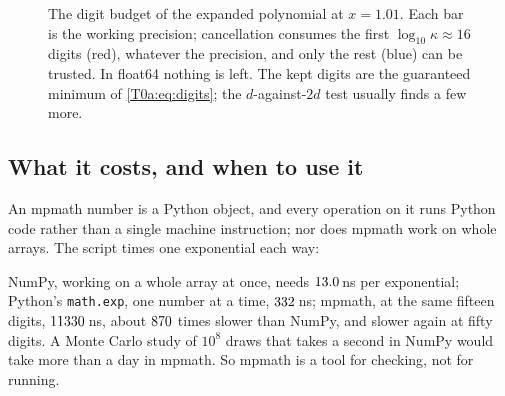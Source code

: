\begin{figure}[htbp]
\centering
{}
\caption{The digit budget of the expanded polynomial at $x=1.01$. Each bar is the working precision; cancellation consumes the first $\log_{10}\kappa\approx16$ digits (red), whatever the precision, and only the rest (blue) can be trusted. In float64 nothing is left. The kept digits are the guaranteed minimum of \eqref{T0a:eq:digits}; the $d$-against-$2d$ test usually finds a few more.}
\label{T0a:fig:digits}
\end{figure}

\subsection{What it costs, and when to use it}
\label{T0a:sec:mp-cost}

An mpmath number is a Python object, and every operation on it runs Python code rather than a single machine instruction; nor does mpmath work on whole arrays. The script times one exponential each way:


NumPy, working on a whole array at once, needs $13.0$\,ns per exponential; Python's \texttt{math.exp}, one number at a time, $332$\,ns; mpmath, at the same fifteen digits, $11330$\,ns, about $870$ times slower than NumPy, and slower again at fifty digits. A Monte Carlo study of $10^8$ draws that takes a second in NumPy would take more than a day in mpmath. So mpmath is a tool for checking, not for running.

